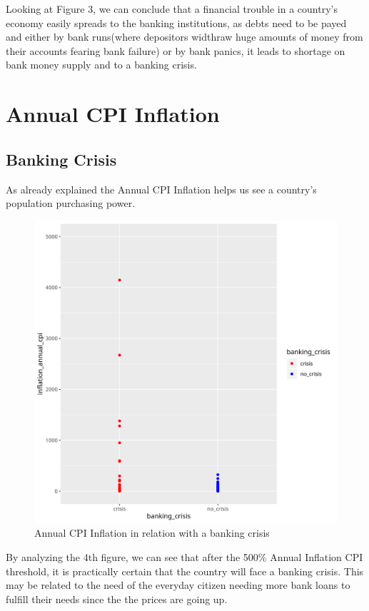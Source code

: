 \documentclass{article}
\begin{document}
    Looking at Figure 3, we can conclude that a financial trouble in a country's economy 
    easily spreads to the banking institutions, as debts need to be payed and 
    either by bank runs(where depositors widthraw huge amounts of money from their accounts 
    fearing bank failure) or by bank panics, it leads to shortage on bank money supply 
    and to a banking crisis.
    
    \newpage
    \section{Annual CPI Inflation}
    \subsection{ Banking Crisis }
    As already explained the Annual CPI Inflation helps us see a country's population purchasing 
    power.
    \begin{figure}[h!]
        \caption{ Annual CPI Inflation in relation with a banking crisis}
        \includegraphics[scale=0.7]{plot2.png}
    \end{figure}
    
    By analyzing the 4th figure, we can see that after the 500\% Annual Inflation CPI threshold,
    it is practically certain that the country will face a banking crisis. This may be related 
    to the need of the everyday citizen needing more bank loans to fulfill their needs since
    the the prices are going up.
    
\end{document}
